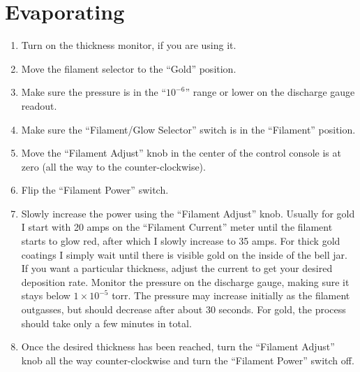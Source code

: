 \documentclass{thesis-umich}
\begin{document}
\section{Evaporating}
\begin{enumerate}
	\item Turn on the thickness monitor, if you are using it. 
	\item Move the filament selector to the ``Gold'' position.
	\item Make sure the pressure is in the ``$10^{-6}$'' range or lower on the discharge gauge readout.
	\item Make sure the ``Filament/Glow Selector'' switch is in the ``Filament'' position.
	\item Move the ``Filament Adjust'' knob in the center of the control console is at zero (all the way to the counter-clockwise).
	\item Flip the ``Filament Power'' switch.
	\item Slowly increase the power using the ``Filament Adjust'' knob. Usually for gold I start with 20 amps on the ``Filament Current'' meter until the filament starts to glow red, after which I slowly increase to 35 amps. For thick gold coatings I simply wait until there is visible gold on the inside of the bell jar. If you want a particular thickness, adjust the current to get your desired deposition rate. Monitor the pressure on the discharge gauge, making sure it stays below $1 \times 10^{-5}$ torr. The pressure may increase initially as the filament outgasses, but should decrease after about 30 seconds. For gold, the process should take only a few minutes in total.
	\item Once the desired thickness has been reached, turn the ``Filament Adjust'' knob all the way counter-clockwise and turn the ``Filament Power'' switch off.
\end{enumerate}
\end{document}
